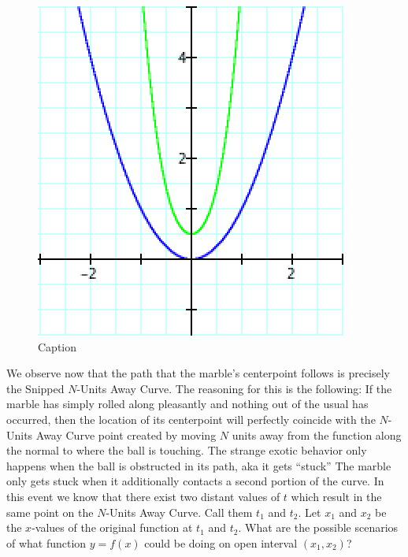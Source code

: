 \begin{figure}[h!]
\begin{minipage}[b]{0.5\linewidth}
    \includegraphics[width=.9\linewidth, height=0.2\textheight, keepaspectratio]{findig-crunch-spots-img/Fig 22.png}
    \caption{Caption}
    \label{fig:fig22}
  \end{minipage} %
\end{figure}

We observe now that the path that the marble’s centerpoint follows is precisely the Snipped $N$-Units Away Curve. The reasoning for this is the following: If the marble has simply rolled along pleasantly and nothing out of the usual has occurred, then the location of its centerpoint will perfectly coincide with the $N$-Units Away Curve point created by moving $N$ units away from the function along the normal to where the ball is touching. The strange exotic behavior only happens when the ball is obstructed in its path, aka it gets ``stuck'' The marble only gets stuck when it additionally contacts a second portion of the curve. In this event we know that there exist two distant values of $t$ which result in the same point on the $N$-Units Away Curve. Call them $t_1$ and $t_2$. Let $x_1$ and $x_2$ be the $x$-values of the original function at $t_1$ and $t_2$. What are the possible scenarios of what function $y = f(x)$ could be doing on open interval $(x_1, x_2)$?

